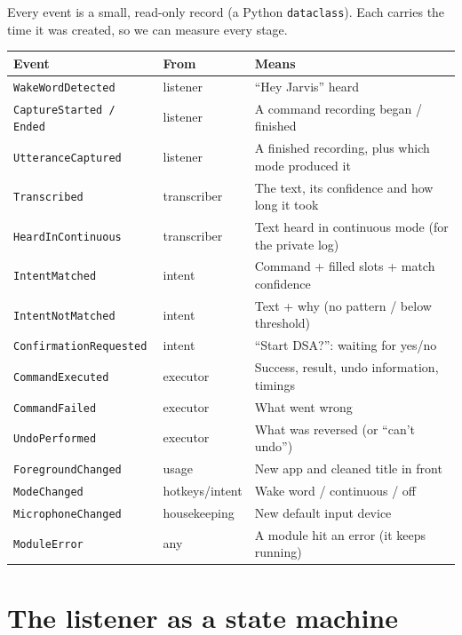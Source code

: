 \documentclass[11pt,a4paper]{article}
\begin{document}
Every event is a small, read-only record (a Python \texttt{dataclass}). Each carries the time it
was created, so we can measure every stage.

\begin{center}
\renewcommand{\arraystretch}{1.15}
\begin{tabularx}{\textwidth}{l l X}
\toprule
\textbf{Event} & \textbf{From} & \textbf{Means} \\
\midrule
\texttt{WakeWordDetected}      & listener   & ``Hey Jarvis'' heard \\
\texttt{CaptureStarted / Ended}& listener   & A command recording began / finished \\
\texttt{UtteranceCaptured}     & listener   & A finished recording, plus which mode produced it \\
\texttt{Transcribed}           & transcriber& The text, its confidence and how long it took \\
\texttt{HeardInContinuous}     & transcriber& Text heard in continuous mode (for the private log) \\
\texttt{IntentMatched}         & intent     & Command + filled slots + match confidence \\
\texttt{IntentNotMatched}      & intent     & Text + why (no pattern / below threshold) \\
\texttt{ConfirmationRequested} & intent     & ``Start DSA?'': waiting for yes/no \\
\texttt{CommandExecuted}       & executor   & Success, result, undo information, timings \\
\texttt{CommandFailed}         & executor   & What went wrong \\
\texttt{UndoPerformed}         & executor   & What was reversed (or ``can't undo'') \\
\texttt{ForegroundChanged}     & usage      & New app and cleaned title in front \\
\texttt{ModeChanged}           & hotkeys/intent & Wake word / continuous / off \\
\texttt{MicrophoneChanged}     & housekeeping & New default input device \\
\texttt{ModuleError}           & any        & A module hit an error (it keeps running) \\
\bottomrule
\end{tabularx}
\end{center}

\section{The listener as a state machine}\label{sec:states}
\end{document}
